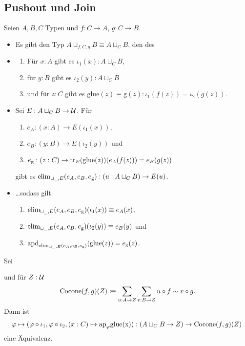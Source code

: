 \subsection{Pushout und Join}
\begin{regeln}
Seien \(A,B,C\) Typen und \(f:C\to A\), \(g:C\to B\).
\begin{itemize}
\item Es gibt den Typ \(A\sqcup_{f,C,g} B\equiv A\sqcup_{C} B\), den  des 
\item 
\begin{enumerate}[\ ]
\item Für \(x:A\) gibt es \(\iota_1(x):A\sqcup_C B\), 
\item für \(y:B\) gibt es \(\iota_2(y):A\sqcup_C B\) 
\item und für \(z:C\) gibt es \(\mathrm{glue}(z)\equiv \mathrm{g}(z) : \iota_1(f(z))=\iota_2(g(z))\).
\end{enumerate}
\item Sei \(E:A\sqcup_C B\to \mathcal{U}\). Für
\begin{enumerate}[\ ]
\item \(e_A:(x:A)\to E(\iota_1(x))\),
\item \(e_B:(y:B)\to E(\iota_2(y))\) und
\item \(e_{\mathrm{g}}:(z:C)\to \mathrm{tr}_E(\mathrm{glue}(z))(e_A(f(z)))=e_B(g(z))\)
\end{enumerate}
gibt es \(\mathrm{elim}_{\sqcup_{\_},E}(e_A,e_B,e_{\mathrm{g}}):(u:A\sqcup_C B)\to E(u)\).
\item \dots sodass gilt
\begin{enumerate}[\ ]
\item \(\mathrm{elim}_{\sqcup_{\_},E}(e_A,e_B,e_{\mathrm{g}})(\iota_1(x))\equiv e_A(x)\),
\item \(\mathrm{elim}_{\sqcup_{\_},E}(e_A,e_B,e_{\mathrm{g}})(\iota_2(y))\equiv e_B(y)\) und
\item \(\mathrm{apd}_{\mathrm{elim}_{\sqcup_{\_},E}(e_A,e_B,e_{\mathrm{g}})}(\mathrm{glue}(z))=e_{\mathrm{g}}(z)\).
\end{enumerate}
\end{itemize}
\end{regeln}

\begin{lemma}
  Sei
 und für \(Z:\mathcal{U}\)
\[
  \mathrm{Cocone}(f,g)(Z)\colonequiv \sum_{u:A \to Z}\sum_{v:B\to Z} u\circ f\sim v\circ g\rlap{.}
\]
  Dann ist
  \[
    \varphi\mapsto (\varphi\circ \iota_1,\varphi\circ\iota_2,(x:C)\mapsto \mathrm{ap}_\varphi\mathrm{glue(x)}) : (A\sqcup_C B\to Z)\to \mathrm{Cocone}(f,g)(Z)
  \]
  eine Äquivalenz.
\end{lemma}

